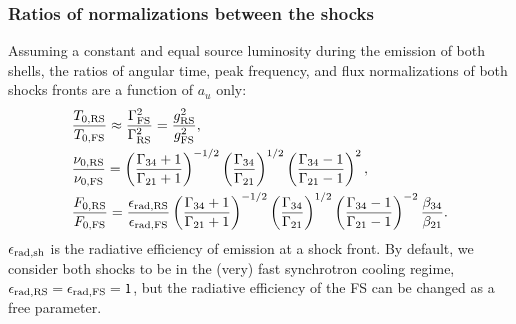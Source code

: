 \documentclass{article}
\newcommand{\sh}{{\rm sh}}
\newcommand{\RS}{{\rm RS}}
\newcommand{\FS}{{\rm FS}}
\begin{document}
\subsubsection{Ratios of normalizations between the shocks}\label{sec:norm_ratios}
Assuming a constant and equal source luminosity during the emission of both shells, the ratios of angular time, peak frequency, and flux normalizations of both shocks fronts are a function of $a_u$ only:
\begin{align}
    &\frac{T_{0,\RS}}{T_{0,\FS}}\approx \frac{\Gamma_\FS^2}{\Gamma_\RS^2} = \frac{g_\RS^2}{g_\FS^2},\label{eqn:ratio_T}\\
    &\frac{\nu_{0,\RS}}{\nu_{0,\FS}} = \left(\frac{\Gamma_{34}+1}{\Gamma_{21}+1}\right)^{-1/2}\left(\frac{\Gamma_{34}}{\Gamma_{21}}\right)^{1/2}\left(\frac{\Gamma_{34}-1}{\Gamma_{21}-1}\right)^2,\label{eqn:ratio_nu}\\
    &\frac{F_{0,\RS}}{F_{0,\FS}}=\frac{\epsilon_{\rm rad,\RS}}{\epsilon_{\rm rad,\FS}}\left(\frac{\Gamma_{34}+1}{\Gamma_{21}+1}\right)^{-1/2}\left(\frac{\Gamma_{34}}{\Gamma_{21}}\right)^{1/2}\left(\frac{\Gamma_{34}-1}{\Gamma_{21}-1}\right)^{-2}\frac{\beta_{34}}{\beta_{21}}.\label{eqn:ratio_F}
\end{align}
$\epsilon_{\rm rad,\sh}$ is the radiative efficiency of emission at a shock front. By default, we consider both shocks to be in the (very) fast synchrotron cooling regime, $\epsilon_{\rm rad,\RS}=\epsilon_{\rm rad,\FS}=1$, but the radiative efficiency of the FS can be changed as a free parameter. 
\end{document}

